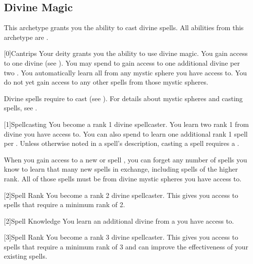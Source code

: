     \newpage
    \subsection{Divine Magic}
        This archetype grants you the ability to cast divine spells.
        All abilities from this archetype are .

        [0]{Cantrips}
        Your deity grants you the ability to use divine magic.
        You gain access to one divine  (see ).
        You may spend  to gain access to one additional divine  per two .
        You automatically learn all  from any mystic sphere you have access to.
        You do not yet gain access to any other spells from those mystic spheres.

        Divine spells require  to cast (see ).
        For details about mystic spheres and casting spells, see .

        [1]{Spellcasting}
        You become a rank 1 divine spellcaster.
        You learn two rank 1  from divine  you have access to.
        You can also spend  to learn one additional rank 1 spell per .
        Unless otherwise noted in a spell's description, casting a spell requires a .

        When you gain access to a new  or spell ,
            you can forget any number of spells you know to learn that many new spells in exchange,
            including spells of the higher rank.
        All of those spells must be from divine mystic spheres you have access to.

        [2]{Spell Rank} You become a rank 2 divine spellcaster.
        This gives you access to spells that require a minimum rank of 2.

        [2]{Spell Knowledge} You learn an additional divine  from a  you have access to.

        [3]{Spell Rank} You become a rank 3 divine spellcaster.
        This gives you access to spells that require a minimum rank of 3 and can improve the effectiveness of your existing spells.

